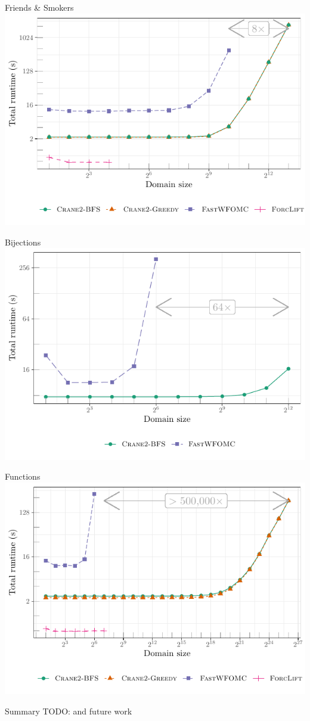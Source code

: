 \documentclass{beamer}
\begin{document}
\begin{frame}{Friends \& Smokers}
  \centering
  \includegraphics{friends.pdf}
\end{frame}

\begin{frame}{Bijections}
  \centering
  \includegraphics{bijections.pdf}
\end{frame}

\begin{frame}{Functions}
  \centering
  \includegraphics{functions.pdf}
\end{frame}

\begin{frame}{Summary}
  TODO: and future work
\end{frame}
\end{document}
